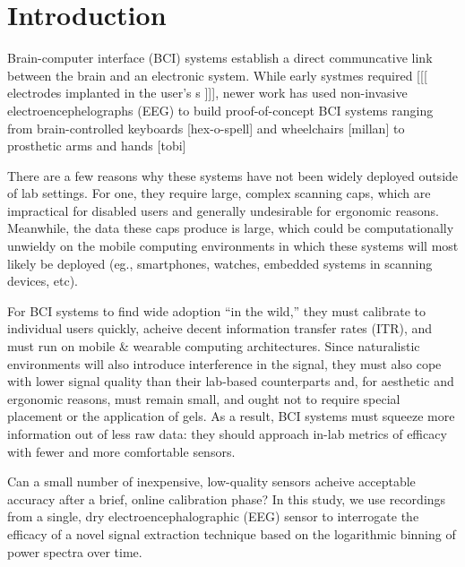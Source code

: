 \section{Introduction}


Brain-computer interface (BCI) systems establish a direct communcative link between the brain and an electronic system. \cite{dornhege_toward_2007,mcfarland_brain-computer_2011} While early systmes required 
[[[ electrodes implanted in the user's s ]]], newer work has used non-invasive electroencephelographs (EEG) to build proof-of-concept BCI systems ranging from brain-controlled keyboards [hex-o-spell] and wheelchairs [millan] to prosthetic arms and hands [tobi] \cite{blankertz_note_2007,millan_combining_2010,d._mattia_brain_2011}

There are a few reasons why these systems have not been widely deployed outside of lab settings. \cite{leeb_transferring_2013,hill_practical_2014} For one, they require large, complex scanning caps, which are impractical for disabled users and generally undesirable for ergonomic reasons. \cite{ekandem_evaluating_2012} Meanwhile, the data these caps produce is large, which could be computationally unwieldy on the mobile computing environments in which these systems will most likely be deployed (eg., smartphones, watches, embedded systems in scanning devices, etc). 

For BCI systems to find wide adoption ``in the wild,'' they must calibrate to individual users quickly, acheive decent information transfer rates (ITR), and must run on mobile & wearable computing architectures. Since naturalistic environments will also introduce interference in the signal, they must also cope with lower signal quality than their lab-based counterparts and, for aesthetic and ergonomic reasons, must remain small, and ought not to require special placement or the application of gels. As a result, BCI systems must squeeze more information out of less raw data: they should approach in-lab metrics of efficacy with fewer and more comfortable sensors. 

Can a small number of inexpensive, low-quality sensors acheive acceptable accuracy after a brief, online calibration phase? In this study, we use recordings from a single, dry electroencephalographic (EEG) sensor to interrogate the efficacy of a novel signal extraction technique based on the logarithmic binning of power spectra over time.




